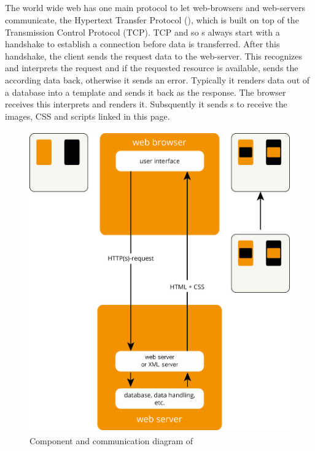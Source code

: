 \subsection{\httpRequest{}\label{httpRequest}}
The world wide web has one main protocol to let web-browsers and web-servers communicate, the Hypertext Transfer Protocol (\http{}), which is built on top of the Transmission Control Protocol (TCP).
TCP and so \httpRequest{}s always start with a handshake to establish a connection before data is transferred.
After this handshake, the client sends the request data to the web-server.
This recognizes and interprets the request and if the requested resource is available, sends the according data back, otherwise it sends an error.
Typically it renders data out of a database into a \html{} template and sends it back as the response.
The browser receives this \webPage{} interprets and renders it.
Subsquently it sends \httpRequest{}s to receive the images, CSS and scripts linked in this page.
\begin{figure}[H]
\centering
\includegraphics[height=13cm]{images/http.png}
\caption[http_components]{Component and communication diagram of \http{}}
\label{fig:http_components}
\end{figure}

